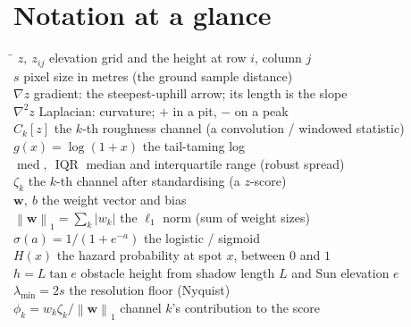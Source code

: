 \documentclass[11pt,oneside]{book}
\newcommand{\norm}[1]{\left\lVert #1\right\rVert}
\newcommand{\abs}[1]{\left\lvert #1\right\rvert}
\begin{document}
\appendix
{}

\chapter{Notation at a glance}
\begin{tabbing}
\hspace{3.2cm}\=\kill
$z,\ z_{ij}$ \> elevation grid and the height at row $i$, column $j$ \\
$s$ \> pixel size in metres (the ground sample distance) \\
$\nabla z$ \> gradient: the steepest-uphill arrow; its length is the slope \\
$\nabla^2 z$ \> Laplacian: curvature; $+$ in a pit, $-$ on a peak \\
$C_k[z]$ \> the $k$-th roughness channel (a convolution / windowed statistic) \\
$g(x)=\log(1+x)$ \> the tail-taming log \\
$\operatorname{med},\ \operatorname{IQR}$ \> median and interquartile range (robust spread) \\
$\zeta_k$ \> the $k$-th channel after standardising (a $z$-score) \\
$\mathbf w,\ b$ \> the weight vector and bias \\
$\norm{\mathbf w}_1=\sum_k\abs{w_k}$ \> the $\ell_1$ norm (sum of weight sizes) \\
$\sigma(a)=1/(1+e^{-a})$ \> the logistic / sigmoid \\
$H(x)$ \> the hazard probability at spot $x$, between $0$ and $1$ \\
$h=L\tan e$ \> obstacle height from shadow length $L$ and Sun elevation $e$ \\
$\lambda_{\min}=2s$ \> the resolution floor (Nyquist) \\
$\phi_k=w_k\zeta_k/\norm{\mathbf w}_1$ \> channel $k$'s contribution to the score
\end{tabbing}
\end{document}
